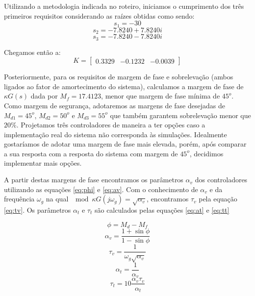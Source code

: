 \documentclass{article}
\begin{document}
Utilizando a metodologia indicada no roteiro\cite{bb:roteiro}, iniciamos o cumprimento dos três primeiros requisitos considerando as raízes obtidas como sendo:
\begin{equation}
	s_1=-30
\end{equation}
\begin{equation}
	s_2=-7.8240 + 7.8240i
\end{equation}
\begin{equation}
	s_3=-7.8240 - 7.8240i
\end{equation}

Chegamos então a: 
\begin{equation}
\label{eq:matk}
K=
\begin{bmatrix}
0.3329 & -0.1232 & -0.0039
\end{bmatrix}
\end{equation}

Posteriormente, para os requisitos de margem de fase e sobrelevação (ambos ligados ao fator de amortecimento do sistema), calculamos a margem de fase de $\kappa G(s)$ dada por $M_f=17.4123$, menor que margem de fase mínima de $45^o$. Como margem de segurança, adotaremos as margens de fase desejadas de $M_{d1}=45^o$, $M_{d2}=50^o$ e $M_{d3}=55^o$ que também garantem sobrelevação menor que $20\%$. Projetamos três controladores de maneira a ter opções caso a implementação real do sistema não corresponda às simulações. Idealmente gostaríamos de adotar uma margem de fase mais elevada, porém, após comparar a sua resposta com a resposta do sistema com margem de $45^o$, decidimos implementar mais opções.

A partir destas margens de fase encontramos os parâmetros $\alpha_v$ dos controladores utilizando as equações \ref{eq:phi} e \ref{eq:av}. Com o conhecimento de $\alpha_v$ e da frequência $\omega_g$ na qual $\mod{\kappa G(j\omega_g)}=\sqrt{\alpha_v}$, encontramos $\tau_v$ pela equação \ref{eq:tv}. Os parâmetros $\alpha_t$ e $\tau_t$ são calculados pelas equações \ref{eq:at} e \ref{eq:tt}

\begin{equation}
\label{eq:phi}
\phi=M_d-M_f
\end{equation}
\begin{equation}
	\label{eq:av}
	\alpha_v=\frac{1+\sin{\phi}}{1-\sin{\phi}}
\end{equation}
\begin{equation}
	\label{eq:tv}
	\tau_v=\frac{1}{\omega_g \sqrt{\alpha_v}}
\end{equation}
\begin{equation}
\label{eq:at}
\alpha_t=\frac{1}{\alpha_v}
\end{equation}
\begin{equation}
\label{eq:tt}
\tau_t=10\frac{\alpha_v \tau_v}{\alpha_t}
\end{equation}
\end{document}

